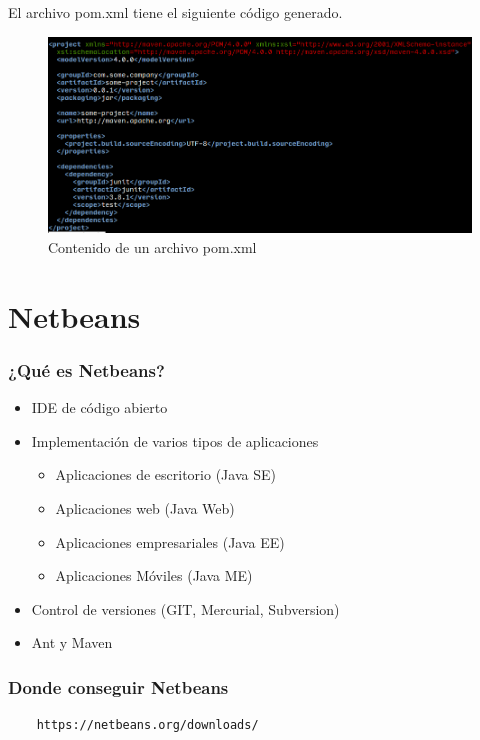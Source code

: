 \documentclass{beamer}
\begin{document}
\begin{frame}[fragile]
  El archivo pom.xml tiene el siguiente código generado.
  \begin{figure}[ht]
    \centering
    \includegraphics[scale=0.30]{figures/pom.png}
    \caption{\label{fig:pom} Contenido de un archivo pom.xml}
  \end{figure}

\end{frame}

\section{Netbeans}

\begin{frame}
  \frametitle{¿Qué es Netbeans?}
  \begin{itemize}
  \item IDE de código abierto
  \item Implementación de varios tipos de aplicaciones
    \begin{itemize}
    \item Aplicaciones de escritorio (Java SE)
    \item Aplicaciones web (Java Web)
    \item Aplicaciones empresariales (Java EE)
    \item Aplicaciones Móviles (Java ME)
    \end{itemize}
  \item Control de versiones (GIT, Mercurial, Subversion)
  \item Ant y Maven
  \end{itemize}
\end{frame}


\begin{frame}[fragile]
  \frametitle{Donde conseguir Netbeans}
  \begin{verbatim}
    https://netbeans.org/downloads/
  \end{verbatim}
\end{frame}
\end{document}
